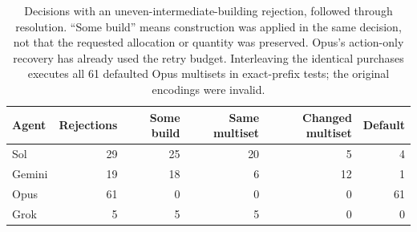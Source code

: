 \begin{table}[t]
\centering\small
\begin{tabular}{lrrrrr}\toprule
Agent & Rejections & Some build & Same multiset & Changed multiset & Default\\\midrule
Sol & 29 & 25 & 20 & 5 & 4 \\
Gemini & 19 & 18 & 6 & 12 & 1 \\
Opus & 61 & 0 & 0 & 0 & 61 \\
Grok & 5 & 5 & 5 & 0 & 0 \\
\bottomrule\end{tabular}
\caption{Decisions with an uneven-intermediate-building rejection, followed through resolution. ``Some build'' means construction was applied in the same decision, not that the requested allocation or quantity was preserved. Opus's action-only recovery has already used the retry budget. Interleaving the identical purchases executes all 61 defaulted Opus multisets in exact-prefix tests; the original encodings were invalid.}
\label{tab:recovery}
\end{table}
